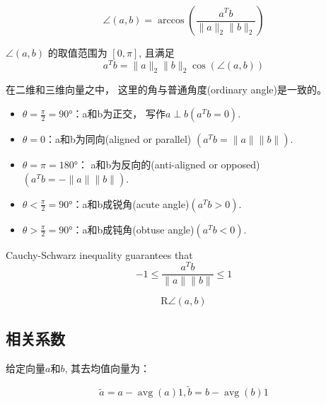 \begin{definition}
    \begin{equation} \angle(a, b)=\arccos \left(\frac{a^{T} b}{\|a\|_{2}\|b\|_{2}}\right) \end{equation}

    $ \angle(a, b) $ 的取值范围为 $ [0, \pi] $, 且满足\begin{equation} a^{T} b=\|a\|_{2}\|b\|_{2} \cos (\angle(a, b)) \end{equation}
\end{definition}

在二维和三维向量之中， 这里的角与普通角度(ordinary angle)是一致的。 

\begin{itemize}
    \item $\theta =\frac{\pi}{2}=90°$：a和b为正交， 写作$a \perp b (a ^T b  =0)$. 
    \item $\theta =0$：a和b为同向(aligned or parallel) $(a ^T  b=\| a \| \| b  \| )$. 
    \item $\theta =\pi =180°$： a和b为反向的(anti-aligned or opposed)$(a ^T   b  = - \| a \| \| b \| )$. 
    \item $\theta <\frac{\pi}{2}=90°$：a和b成锐角(acute angle)$(a ^T b >0)$. 
    \item $\theta >\frac{\pi}{2}=90°$：a和b成钝角(obtuse angle)$(a ^T b <0)$. 
\end{itemize}

\begin{theorem}
    Cauchy-Schwarz inequality guarantees that
\begin{equation}
-1 \leq \frac{a^{T} b}{\|a\|\|b\|} \leq 1
\end{equation}
\end{theorem}

\begin{definition}[球面的距离]
    \begin{equation}  \mathrm{R} \angle(a, b) \end{equation}
\end{definition}

\subsection{相关系数}

给定向量$a$和$b$, 其去均值向量为：

\begin{equation} \tilde{a}=a-\operatorname{avg}(a) 1,  \tilde{b}=b-\operatorname{avg}(b) 1 \end{equation}

